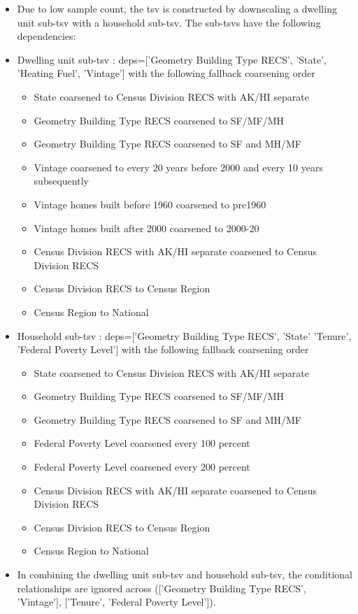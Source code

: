 \begin{itemize}
\item Due to low sample count, the tsv is constructed by downscaling a dwelling unit sub-tsv with a household sub-tsv. The sub-tsvs have the following dependencies:
\item Dwelling unit sub-tsv : deps=['Geometry Building Type RECS', 'State', 'Heating Fuel', 'Vintage'] with the following fallback coarsening order
  \begin{itemize}
  \item [1] State coarsened to Census Division RECS with AK/HI separate
  \item [2] Geometry Building Type RECS coarsened to SF/MF/MH
  \item [3] Geometry Building Type RECS coarsened to SF and MH/MF
  \item [4] Vintage coarsened to every 20 years before 2000 and every 10 years subsequently
  \item [5] Vintage homes built before 1960 coarsened to pre1960
  \item [6] Vintage homes built after 2000 coarsened to 2000-20
  \item [7] Census Division RECS with AK/HI separate coarsened to Census Division RECS
  \item [8] Census Division RECS to Census Region
  \item [9] Census Region to National
  \end{itemize}
\item Household sub-tsv : deps=['Geometry Building Type RECS', 'State' 'Tenure', 'Federal Poverty Level'] with the following fallback coarsening order
  \begin{itemize}
  \item [1] State coarsened to Census Division RECS with AK/HI separate
  \item [2] Geometry Building Type RECS coarsened to SF/MF/MH
  \item [3] Geometry Building Type RECS coarsened to SF and MH/MF
  \item [4] Federal Poverty Level coarsened every 100 percent
  \item [5] Federal Poverty Level coarsened every 200 percent
  \item [6] Census Division RECS with AK/HI separate coarsened to Census Division RECS
  \item [7] Census Division RECS to Census Region
  \item [8] Census Region to National
  \end{itemize}
\item In combining the dwelling unit sub-tsv and household sub-tsv, the conditional relationships are ignored across (['Geometry Building Type RECS', 'Vintage'], ['Tenure', 'Federal Poverty Level']).
\end{itemize}
